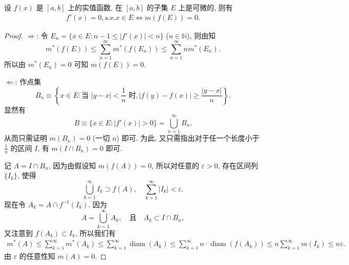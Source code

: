 \documentclass[../../main.tex]{subfiles}%
\begin{document}
\begin{theorem}\label{theorem:实变函数--定理5.21}
设 $f(x)$ 是 $[a,b]$ 上的实值函数, 在 $[a,b]$ 的子集 $E$ 上是可微的, 则有
\begin{align*}
f'(x)=0, \text{a.e.} x\in E\iff m(f(E))=0.
\end{align*}
\end{theorem}
\begin{proof}

$\Longrightarrow$: 令 $E_n = \{x\in E: n-1\leqslant|f'(x)|<n\}$ ($n\in\mathbb{N}$), 则由知
\[
m^*(f(E)) \leqslant \sum_{n=1}^{\infty} m^*(f(E_n)) \leqslant \sum_{n=1}^{\infty} n m^*(E_n).
\]
所以由 $m^*(E_n)=0$ 可知 $m(f(E))=0$.

$\Longleftarrow$: 作点集
\[
B_n \equiv \left\{x\in E: \text{当 } |y-x|<\frac{1}{n} \text{ 时}, |f(y)-f(x)|\geqslant\frac{|y-x|}{n}\right\}.
\]
显然有
\[
B \equiv \{x\in E: |f'(x)|>0\} = \bigcup_{n=1}^{\infty} B_n.
\]
从而只需证明 $m(B_n)=0$ (一切 $n$) 即可. 为此, 又只需指出对于任一个长度小于 $\frac{1}{n}$ 的区间 $I$, 有 $m(I\cap B_n)=0$ 即可.

记 $A=I\cap B_n$, 因为由假设知 $m(f(A))=0$, 所以对任意的 $\varepsilon>0$, 存在区间列 $\{I_k\}$, 使得
\[
\bigcup_{k=1}^{\infty} I_k \supset f(A), \quad \sum_{k=1}^{\infty} |I_k| < \varepsilon.
\]
现在令 $A_k = A\cap f^{-1}(I_k)$. 因为
\[
A = \bigcup_{k=1}^{\infty} A_k, \quad \text{且} \quad A_k \subset I\cap B_n,
\]
又注意到 $f(A_k)\subset I_k$, 所以我们有
\begin{align*}
m^*(A) \leqslant \sum_{k=1}^{\infty} m^*(A_k) \leqslant \sum_{k=1}^{\infty} \operatorname{diam}(A_k) 
\leqslant \sum_{k=1}^{\infty} n \cdot \operatorname{diam}(f(A_k)) \leqslant n \sum_{k=1}^{\infty} m(I_k) \leqslant n\varepsilon.
\end{align*}
由 $\varepsilon$ 的任意性知 $m(A)=0$.
\end{proof}
\end{document}
